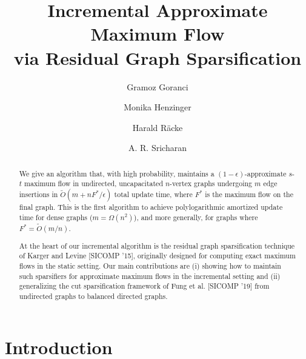 \documentclass[11pt,a4paper]{article}
\begin{document}
\title{Incremental Approximate Maximum Flow \\ via Residual Graph Sparsification}
\date{}
\author[1]{Gramoz Goranci}
\author[2]{Monika Henzinger}
\author[3]{Harald R\"acke}
\author[4]{A. R. Sricharan}

\maketitle

\begin{abstract}
We give an algorithm that, with high probability, maintains a $(1-\epsilon)$-approximate $s$-$t$ maximum flow in undirected, uncapacitated $n$-vertex graphs undergoing $m$ edge insertions in $\tilde{O}(m+ n F^*/\epsilon)$ total update time, where $F^{*}$ is the maximum flow on the final graph. This is the first algorithm to achieve polylogarithmic amortized update time for dense graphs ($m = \Omega(n^2)$), and more generally, for graphs where $F^*= \tilde{O}(m/n)$. 

At the heart of our incremental algorithm is the residual graph sparsification technique of Karger and Levine [SICOMP '15], originally designed for computing exact maximum flows in the static setting. Our main contributions are (i) showing how to maintain such sparsifiers for approximate maximum flows in the incremental setting and (ii) generalizing the cut sparsification framework of Fung et al. [SICOMP '19] from undirected graphs to balanced directed graphs. 

 \end{abstract}

\section{Introduction}
\label{sec:intro}
\end{document}
